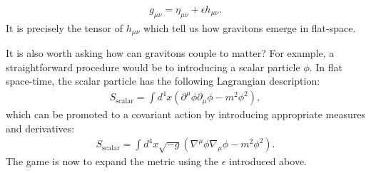 \documentclass[11pt,a4paper]{article}
\begin{document}
\begin{align*}
	g_{\mu \nu} = \eta _{\mu \nu} + \epsilon h_{\mu \nu}.
\end{align*}
It is precisely the tensor of $h_{\mu \nu}$ which tell us how gravitons emerge in flat-space.

It is also worth asking how can gravitons couple to matter?  For example, a straightforward procedure would be to introducing a scalar particle $\phi$.  In flat space-time, the scalar particle has the following Lagrangian description:
\begin{align*}
	S_{\mathrm{scalar}} = \int d^4 x \left(\partial^\mu \phi \partial_\mu \phi- m^2 \phi^2\right),
\end{align*}
which can be promoted to a covariant action by introducing appropriate measures and derivatives:
\begin{align*}
	S_{\mathrm{scalar}} = \int d^4 x \sqrt{-g}\left(\nabla^\mu \phi \nabla_\mu \phi - m^2 \phi^2\right).
\end{align*}
The game is now to expand the metric using the $\epsilon$ introduced above. 
\end{document}

